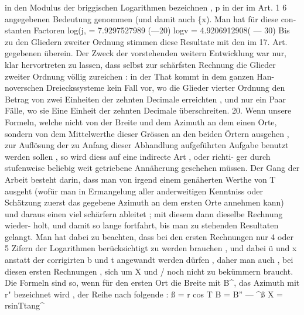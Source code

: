 \documentclass[12pt,a4paper]{article}
\begin{document}
in  den  Modulus  der  briggischen  Logarithmen  bezeichnen ,  p  in  der  im  Art.  1 6 angegebenen  Bedeutung  genommen  (und  damit  auch  \{x).  Man  hat  für  diese  con- stanten  Factoren log(j,  =  7.9297527989  (---20) logv  =  4.9206912908( --- 30) Bis  zu  den  Gliedern  zweiter  Ordnung  stimmen  diese  Resultate  mit  den  im 17.  Art.  gegebenen  überein.  Der  Zweck  der  vorstehenden  weitern  Entwicklung war  nur,  klar  hervortreten  zu  lassen,  dass  selbst  zur  schärfsten  Rechnung  die Glieder  zweiter  Ordnung  völlig  zureichen :  in  der  That  kommt  in  dem  ganzen  Han- noverschen Dreieckssysteme  kein  Fall  vor,  wo  die  Glieder  vierter  Ordnung  den Betrag  von  zwei  Einheiten  der  zehnten  Decimale  erreichten ,  und  nur  ein  Paar Fälle,  wo  sie  Eine  Einheit  der  zehnten  Decimale  überschreiten. 20. Wenn  unsere  Formeln,  welche  nicht  von  der  Breite  und  dem  Azimuth  an dem  einen  Orte,  sondern  von  dem  Mittelwerthe  dieser  Grössen  an  den  beiden Örtern  ausgehen ,  zur  Auflösung  der  zu  Anfang  dieser  Abhandlung  aufgeführten Aufgabe  benutzt  werden  sollen ,  so  wird  diess  auf  eine  indirecte  Art ,  oder  richti- ger durch  stufenweise  beliebig  weit  getriebene  Annäherung  geschehen  müssen. Der  Gang  der  Arbeit  besteht  darin,  dass  man  von  irgend  einem  genäherten  Werthe von  T  ausgeht  (wofür  man  in  Ermangelung  aller  anderweitigen  Kenntniss  oder Schätzung  zuerst  das  gegebene  Azimuth  an  dem  ersten  Orte  annehmen  kann)  und daraus  einen  viel  schärfern  ableitet ;  mit  diesem  dann  dieselbe  Rechnung  wieder- holt, und  damit  so  lange  fortfahrt,  bis  man  zu  stehenden  Resultaten  gelangt. Man  hat  dabei  zu  beachten,  dass  bei  den  ersten  Rechnungen  nur  4  oder  5  Zifern der  Logarithmen  berücksichtigt  zu  werden  brauchen ,  und  dabei  ü  und  x  anstatt der  corrigirten  b  und  t  angewandt  werden  dürfen ,  daher  man  auch ,  bei  diesen ersten  Rechnungen ,  sich  um  X  und  /  noch  nicht  zu  bekümmern  braucht.  Die Formeln  sind  so,  wenn  für  den  ersten  Ort  die  Breite  mit  B\^{},  das  Azimuth  mit r"  bezeichnet  wird ,  der  Reihe  nach  folgende : ß  =  r  cos  T B  =  B''  ---  \^{}ß X  =  rsinTtang\^{}
\end{document}

